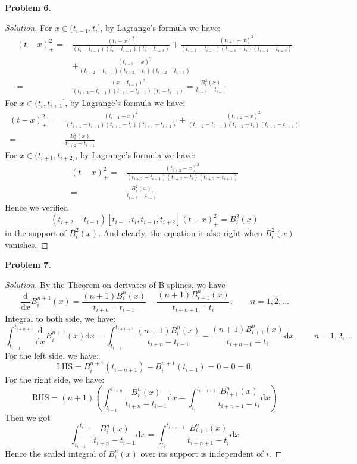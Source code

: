 \documentclass[a4paper]{ctexart}
\begin{document}
\textbf{Problem 6.}

\begin{proof}[Solution]
	For $x\in(t_{i-1},t_i]$, by Lagrange's formula we have:
	\begin{align*}
		[t_{i-1},t_i,t_{i+1},t_{i+2}](t-x)_+^2= & \frac{(t_i-x)^2}{(t_i-t_{i-1})(t_{i}-t_{i+1})(t_i-t_{i+2})}+\frac{(t_{i+1}-x)^2}{(t_{i+1}-t_{i-1})(t_{i+1}-t_{i})(t_{i+1}-t_{i+2})} \\
		                                        & +\frac{(t_{i+2}-x)^2}{(t_{i+2}-t_{i-1})(t_{i+2}-t_{i})(t_{i+2}-t_{i+1})}                                                            \\
		=                                       & \frac{(x-t_{i-1})^2}{(t_{i+2}-t_{i-1})(t_{i+1}-t_{i-1})(t_i-t_{i-1})}=\frac{B_i^2(x)}{t_{i+2}-t_{i-1}}
	\end{align*}
	For $x\in(t_{i},t_{i+1}]$, by Lagrange's formula we have:
	\begin{align*}
		[t_{i-1},t_i,t_{i+1},t_{i+2}](t-x)_+^2= & \frac{(t_{i+1}-x)^2}{(t_{i+1}-t_{i-1})(t_{i+1}-t_{i})(t_{i+1}-t_{i+2})}+\frac{(t_{i+2}-x)^2}{(t_{i+2}-t_{i-1})(t_{i+2}-t_{i})(t_{i+2}-t_{i+1})} \\
		=                                       & \frac{B_i^2(x)}{t_{i+2}-t_{i-1}}
	\end{align*}
	For $x\in(t_{i+1},t_{i+2}]$, by Lagrange's formula we have:
	\begin{align*}
		[t_{i-1},t_i,t_{i+1},t_{i+2}](t-x)_+^2= & \frac{(t_{i+2}-x)^2}{(t_{i+2}-t_{i-1})(t_{i+2}-t_{i})(t_{i+2}-t_{i+1})} \\
		=                                       & \frac{B_i^2(x)}{t_{i+2}-t_{i-1}}
	\end{align*}
	Hence we verified
	$$
		(t_{i+2}-t_{i-1})[t_{i-1},t_i,t_{i+1},t_{i+2}](t-x)_+^2=B_i^2(x)
	$$
	in the support of $B_i^2(x)$. And clearly, the equation is also right when $B_i^2(x)$ vanishes.
\end{proof}

\textbf{Problem 7.}

\begin{proof}[Solution]
	By the Theorem on derivates of B-splines, we have
	$$
		\frac{\text{d}}{\text{d}x}B_i^{n+1}(x)=\frac{(n+1)B_i^{n}(x)}{t_{i+n}-t_{i-1}}-\frac{(n+1)B_{i+1}^{n}(x)}{t_{i+n+1}-t_i} ,\qquad n=1,2,...
	$$
	Integral to both side, we have:
	$$
		\int_{t_{i-1}}^{t_{i+n+1}}\frac{\text{d}}{\text{d}x}B_i^{n+1}(x) \text{d}x=\int_{t_{i-1}}^{t_{i+n+1}}\frac{(n+1)B_i^{n}(x)}{t_{i+n}-t_{i-1}}-\frac{(n+1)B_{i+1}^{n}(x)}{t_{i+n+1}-t_i}\text{d} x,\qquad n=1,2,...
	$$
	For the left side, we have:
	$$
		\text{LHS}=B_i^{n+1}(t_{i+n+1})-B_i^{n+1}(t_{i-1})=0-0=0.
	$$
	For the right side, we have:
	$$
		\text{RHS}=(n+1)\left(\int_{t_{i-1}}^{t_{i+n}}\frac{B_i^{n}(x)}{t_{i+n}-t_{i-1}} \text{d}x-\int_{t_{i}}^{t_{i+n+1}}\frac{B_{i+1}^{n}(x)}{t_{i+n+1}-t_{i}} \text{d}x\right)
	$$
	Then we got
	$$
		\int_{t_{i-1}}^{t_{i+n}}\frac{B_i^{n}(x)}{t_{i+n}-t_{i-1}} \text{d}x=\int_{t_{i}}^{t_{i+n+1}}\frac{B_{i+1}^{n}(x)}{t_{i+n+1}-t_{i}} \text{d}x
	$$
	Hence the scaled integral of $B_i^n(x)$ over its support is independent of $i$.
\end{proof}
\end{document}
